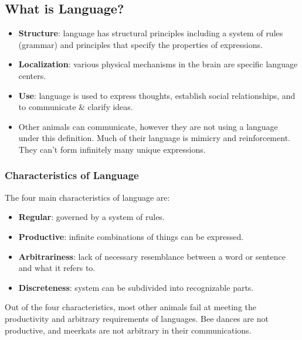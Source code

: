 \documentclass[]{article}
\begin{document}
		\subsection{What is Language?}
			\begin{itemize}
				\item \textbf{Structure}: language has structural principles including a system of rules (grammar) and principles that specify the properties of expressions.
				\item \textbf{Localization}: various physical mechanisms in the brain are specific language centers.
				\item \textbf{Use}: language is used to express thoughts, establish social relationships, and to communicate \& clarify ideas.
				\item Other animals can communicate, however they are not using a language under this definition. Much of their language is mimicry and reinforcement. They can't form infinitely many unique expressions.
			\end{itemize}

			\subsubsection{Characteristics of Language}
				The four main characteristics of language are:
				\begin{itemize}
					\item \textbf{Regular}: governed by a system of rules.
					\item \textbf{Productive}: infinite combinations of things can be expressed.
					\item \textbf{Arbitrariness}: lack of necessary resemblance between a word or sentence and what it refers to.
					\item \textbf{Discreteness}: system can be subdivided into recognizable parts.
				\end{itemize}

				Out of the four characteristics, most other animals fail at meeting the productivity and arbitrary requirements of languages. Bee dances are not productive, and meerkats are not arbitrary in their communications.
\end{document}
